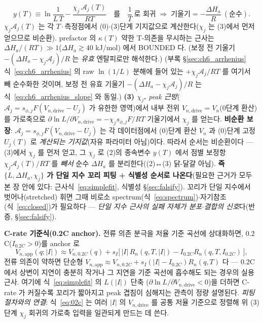 \documentclass[11pt,a4paper]{article}
\newcommand{\app}{\mathrm{app}}
\newcommand{\drive}{\mathrm{drive}}
\begin{document}
\begin{equation*}
y(T)\equiv\ln\!\frac{1}{L\,T}-\frac{\chi_j\,\mathcal A_j(T)}{RT}\quad\text{를}\quad \frac1T\ \text{로 회귀} \;\Rightarrow\; \text{기울기}=-\frac{\Delta H_a}{R}\ (\text{순수}).
\end{equation*}
$\chi_j\mathcal A_j(T)$ 는 각 $T\cdot$측정점에서 (0)$\cdot$(3)단계 기지값으로 계산한다($\chi_j$ 는 (3)에서 먼저 얻으므로
비순환). prefactor 의 $\kappa(T)$ 약한 T-의존을 무시하는 근사는 $\Delta H_a/(RT)\gg1$($\Delta H_a\gtrsim40$ kJ/mol)
에서 BOUNDED 다. (보정 전 기울기 $-(\Delta H_a-\chi_j\mathcal A_j)/R$ 는 \emph{유효} 엔탈피로만 해석한다.)
(부록 \S\ref{sec:ch6_arrhenius} 식~\eqref{eq:ch6_arrhenius} 의 raw $\ln(1/L)$ 분해에 들어 있는 $+\chi_j\mathcal A_j/RT$ 를
여기서 빼 순수화한 것이며, 보정 전 유효 기울기 $-(\Delta H_a-\chi_j\mathcal A_j)/R$ 는 식~\eqref{eq:ch6_arrhenius_slope} 와 동일.)
\textbf{(3) $\chi_j$.} \emph{peak 근방}($\mathcal A_j=s_{\phi,j}F(V_{n,\drive}-U_j)$ 가 유한한 영역)에서 내부 전위
$V_{n,\drive}=V_n$(0단계 환산)를 가로축으로 $\partial\ln L/\partial V_{n,\drive}=-\chi_j s_{\phi,j}F/RT$ 기울기에서
$\chi_j$ 를 얻는다. \textbf{비순환 보장}: $\mathcal A_j=s_{\phi,j}F(V_{n,\drive}-U_j)$ 는 각 데이터점에서 (0)단계 환산
$V_n$ 과 (0)단계 고정 $U_j(T)$ 로 \emph{계산되는 기지값}(자유 파라미터 아님)이다. 따라서 순서는 비순환이다 — (3)에서
$\chi_j$ 를 먼저 얻고, 그 $\chi_j$ 로 (2)의 종속변수 $y(T)$ 에서 점별 보정항 $\chi_j\mathcal A_j(T)/RT$ 를 \emph{빼서} 순수
$\Delta H_a$ 를 분리한다((2)↔(3) 닭-달걀 아님). \textbf{즉 $\{L,\Delta H_a,\chi_j\}$ 가 단일 지수 꼬리 피팅
+ 식별성 순서로 나온다}(필요한 근거가 모두 본 장 안에 있다: 근사식~\eqref{eq:simplefit}, 식별성 \S\ref{sec:falsify}). 꼬리가 단일 지수에서
벗어나(stretched) 휘면 그때 비로소 spectrum(식~\eqref{eq:spectrum})$\cdot$자기참조(식~\eqref{eq:closed})가
필요하다 — \emph{단일 지수 근사의 실패 자체가 분포$\cdot$결합의 신호}다(반증, \S\ref{sec:falsify}).

\textbf{C-rate 기준식(0.2C anchor).} 전류 의존 분극을 저율 기준 곡선에 상대화하면, $0.2$C($I_{0.2C}>0$)를 anchor 로
\begin{equation}
V_{n,\app}(q;|I|)\approx V_{n,0.2C}(q)+s_I\big[\,|I|\,R_n(q,T,|I|)-I_{0.2C}R_n(q,T,I_{0.2C})\,\big],
\label{eq:02c}
\end{equation}
전류 의존이 약하면 단순형 $V_{n,\app}\approx V_{n,0.2C}+s_I(|I|-I_{0.2C})R_n(q,T)$ 다 — $0.2$C 에서 상변이 지연이
충분히 작거나 그 지연을 기준 곡선에 흡수해도 되는 경우의 실용 근사. 여기에 식~\eqref{eq:simplefit} 의 $L(|I|)$ 단축
($\partial\ln L/\partial V_{n,\drive}<0$)을 더하면 C-rate 가 커질수록 꼬리가 짧아지고 peak 겹침이 심해지는 관측이
정량 설명된다. \emph{피팅 절차와의 연결}: 식~\eqref{eq:02c} 는 여러 $|I|$ 의 $V_{n,\drive}$ 를 공통 저율 기준으로
정렬해 위 (3)단계 $\chi_j$ 회귀의 가로축 입력을 일관되게 만드는 데 쓴다.
\end{document}

